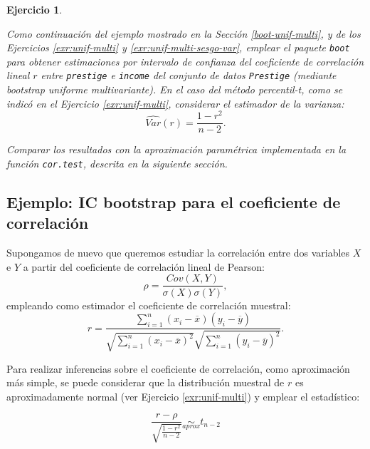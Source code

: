 \documentclass[
  spanish,
  10pt,
]{book}
\theoremstyle{break}
\newtheorem{exercise}{Ejercicio}[chapter]
\theoremstyle{nonumberplain}
\begin{document}
\begin{exercise}
\protect\hypertarget{exr:boot-unif-multi-ic}{}\label{exr:boot-unif-multi-ic}

Como continuación del ejemplo mostrado en la Sección \ref{boot-unif-multi}, y de los Ejercicios \ref{exr:unif-multi} y \ref{exr:unif-multi-sesgo-var}, emplear el paquete \texttt{boot} para obtener estimaciones por intervalo de confianza del coeficiente de correlación lineal \(r\) entre \texttt{prestige} e \texttt{income} del conjunto de datos \texttt{Prestige} (mediante bootstrap uniforme multivariante).
En el caso del método percentil-\emph{t}, como se indicó en el Ejercicio \ref{exr:unif-multi}, considerar el estimador de la varianza:
\[\widehat{Var}(r) = \frac{1 - r^2}{n - 2}.\]

Comparar los resultados con la aproximación paramétrica implementada en la función \texttt{cor.test}, descrita en la siguiente sección.
\end{exercise}

\subsection{Ejemplo: IC bootstrap para el coeficiente de correlación}\label{icboot-trans}

Supongamos de nuevo que queremos estudiar la correlación entre dos variables \(X\) e \(Y\) a partir del coeficiente de correlación lineal de Pearson:
\[\rho =\frac{ Cov \left( X, Y \right) }
{ \sigma \left( X \right) \sigma \left( Y \right) },\]
empleando como estimador el coeficiente de correlación muestral:
\[r=\frac{\sum_{i=1}^{n}(x_i-\overline{x})(y_i-\overline{y})}
{\sqrt{ \sum_{i=1}^{n}(x_i-\overline{x})^{2}} 
\sqrt{\sum_{i=1}^{n}(y_i-\overline{y})^{2}}}.\]

Para realizar inferencias sobre el coeficiente de correlación, como aproximación más simple, se puede considerar que la distribución muestral de \(r\) es aproximadamente normal (ver Ejercicio \ref{exr:unif-multi}) y emplear el estadístico:

\begin{equation} 
\frac{r -\rho}{\sqrt{\frac{1 - r^2}{n - 2}}} \underset{aprox}{\sim } t_{n-2}
\label{eq:cor-t}
\end{equation}
\end{document}
